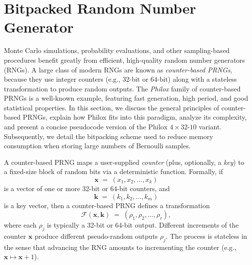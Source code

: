 \section{Bitpacked Random Number Generator}

Monte Carlo simulations, probability evaluations, and other sampling-based procedures benefit greatly from efficient, high-quality random number generators (RNGs). A large class of modern RNGs are known as \textit{counter-based PRNGs}, because they use integer counters (e.g., 32-bit or 64-bit) along with a stateless transformation to produce random outputs. The \emph{Philox} family of counter-based PRNGs is a well-known example, featuring fast generation, high period, and good statistical properties. In this section, we discuss the general principles of counter-based PRNGs, explain how Philox fits into this paradigm, analyze its complexity, and present a concise pseudocode version of the \(\text{Philox }4\times32\text{-10}\) variant. Subsequently, we detail the bitpacking scheme used to reduce memory consumption when storing large numbers of Bernoulli samples.

A counter-based PRNG maps a user-supplied \emph{counter} (plus, optionally, a \emph{key}) to a fixed-size block of random bits via a deterministic function. Formally, if 
\[
  \mathbf{x} \;=\; (x_1, x_2, \ldots, x_k)
\]
is a vector of one or more 32-bit or 64-bit counters, and 
\[
  \mathbf{k} \;=\; (k_1, k_2, \ldots, k_m)
\]
is a key vector, then a counter-based PRNG defines a transformation 
\[
   \mathcal{F}(\mathbf{x}, \mathbf{k})
   \;=\;
   (\rho_1, \rho_2, \ldots, \rho_r),
\]
where each \(\rho_j\) is typically a 32-bit or 64-bit output. Different increments of the counter \(\mathbf{x}\) produce different pseudo-random outputs \(\rho_j\). The process is stateless in the sense that advancing the RNG amounts to incrementing the counter (e.g., \(\mathbf{x}\mapsto \mathbf{x} + 1\)).

